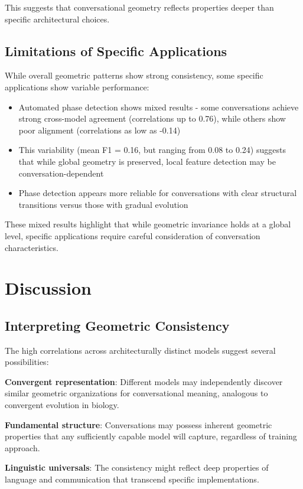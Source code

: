 \documentclass[11pt,letterpaper]{article}
\newcommand{\phaseDetectionF}{0.16}
\begin{document}
This suggests that conversational geometry reflects properties deeper than specific architectural choices.

\subsection{Limitations of Specific Applications}

While overall geometric patterns show strong consistency, some specific applications show variable performance:
\begin{itemize}
\item Automated phase detection shows mixed results - some conversations achieve strong cross-model agreement (correlations up to 0.76), while others show poor alignment (correlations as low as -0.14)
\item This variability (mean F1 = \phaseDetectionF{}, but ranging from 0.08 to 0.24) suggests that while global geometry is preserved, local feature detection may be conversation-dependent
\item Phase detection appears more reliable for conversations with clear structural transitions versus those with gradual evolution
\end{itemize}

These mixed results highlight that while geometric invariance holds at a global level, specific applications require careful consideration of conversation characteristics.

\section{Discussion}

\subsection{Interpreting Geometric Consistency}

The high correlations across architecturally distinct models suggest several possibilities:

\textbf{Convergent representation}: Different models may independently discover similar geometric organizations for conversational meaning, analogous to convergent evolution in biology.

\textbf{Fundamental structure}: Conversations may possess inherent geometric properties that any sufficiently capable model will capture, regardless of training approach.

\textbf{Linguistic universals}: The consistency might reflect deep properties of language and communication that transcend specific implementations.
\end{document}
